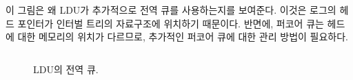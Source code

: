 이 그림은 왜 LDU가 추가적으로 전역 큐를 사용하는지를 보여준다. 
이것은 로그의 헤드 포인터가 인터벌 트리의 자료구조에 위치하기 때문이다.
반면에, 퍼코어 큐는 헤드에 대한 메모리의 위치가 다르므로,  
추가적인 퍼코어 큐에 대한 관리 방법이 필요하다. 



\begin{figure}[h]
\begin{center}
\inputminted[linenos,fontsize=\footnotesize,
tabsize=4]{c}{src/ldu_queue_global.c}
\end{center}
\caption{LDU의 전역 큐.}
\label{fig:glduphysicalupdate}
\end{figure}

